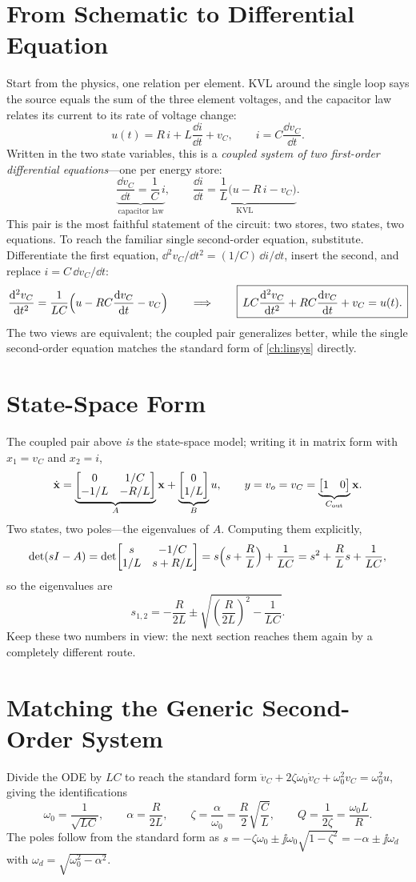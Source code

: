 \section{From Schematic to Differential Equation}
Start from the physics, one relation per element. KVL around the single loop says
the source equals the sum of the three element voltages, and the capacitor law
relates its current to its rate of voltage change:
\[
u(t)=R\,i+L\frac{\dd i}{\dd t}+v_C,
\qquad
i=C\frac{\dd v_C}{\dd t}.
\]
Written in the two state variables, this is a \emph{coupled system of two
first-order differential equations}---one per energy store:
\[
\underbrace{\frac{\dd v_C}{\dd t}=\frac{1}{C}\,i}_{\text{capacitor law}},
\qquad
\underbrace{\frac{\dd i}{\dd t}=\frac{1}{L}\bigl(u-R\,i-v_C\bigr)}_{\text{KVL}} .
\]
This pair is the most faithful statement of the circuit: two stores, two states,
two equations. To reach the familiar single second-order equation, substitute.
Differentiate the first equation, \(\dd^2v_C/\dd t^2=(1/C)\,\dd i/\dd t\), insert
the second, and replace \(i=C\,\dd v_C/\dd t\):
\[
\frac{\mathrm{d}^2 v_C}{\mathrm{d} t^2}
=\frac{1}{LC}\Bigl(u-RC\frac{\mathrm{d} v_C}{\mathrm{d} t}-v_C\Bigr)
\qquad\Longrightarrow\qquad
\boxed{\,LC\frac{\mathrm{d}^2 v_C}{\mathrm{d} t^2}+RC\frac{\mathrm{d} v_C}{\mathrm{d} t}+v_C=u(t).\,}
\]
The two views are equivalent; the coupled pair generalizes better, while the single
second-order equation matches the standard form of \cref{ch:linsys} directly.

\section{State-Space Form}
The coupled pair above \emph{is} the state-space model; writing it in matrix form
with \(x_1=v_C\) and \(x_2=i\),
\[
\dot{\mathbf{x}}=
\underbrace{\begin{bmatrix}0 & 1/C\\ -1/L & -R/L\end{bmatrix}}_{A}\mathbf{x}
+\underbrace{\begin{bmatrix}0\\ 1/L\end{bmatrix}}_{B}u,
\qquad
y=v_o=v_C=\underbrace{\begin{bmatrix}1 & 0\end{bmatrix}}_{C_{\text{out}}}\mathbf{x} .
\]
Two states, two poles---the eigenvalues of \(A\). Computing them explicitly,
\[
\det(sI-A)
=\det\!\begin{bmatrix}s & -1/C\\ 1/L & s+R/L\end{bmatrix}
=s\Bigl(s+\frac{R}{L}\Bigr)+\frac{1}{LC}
=s^2+\frac{R}{L}s+\frac{1}{LC},
\]
so the eigenvalues are
\[
s_{1,2}=-\frac{R}{2L}\pm\sqrt{\left(\frac{R}{2L}\right)^{\!2}-\frac{1}{LC}} .
\]
Keep these two numbers in view: the next section reaches them again by a completely
different route.

\section{Matching the Generic Second-Order System}
Divide the ODE by \(LC\) to reach the standard form
\(\ddot v_C+2\zeta\omega_0\dot v_C+\omega_0^2 v_C=\omega_0^2 u\), giving the
identifications
\[
\omega_0=\frac{1}{\sqrt{LC}},
\qquad
\alpha=\frac{R}{2L},
\qquad
\zeta=\frac{\alpha}{\omega_0}=\frac{R}{2}\sqrt{\frac{C}{L}},
\qquad
Q=\frac{1}{2\zeta}=\frac{\omega_0 L}{R}.
\]
The poles follow from the standard form as
\(s=-\zeta\omega_0\pm\jj\omega_0\sqrt{1-\zeta^2}=-\alpha\pm\jj\omega_d\) with
\(\omega_d=\sqrt{\omega_0^2-\alpha^2}\).

